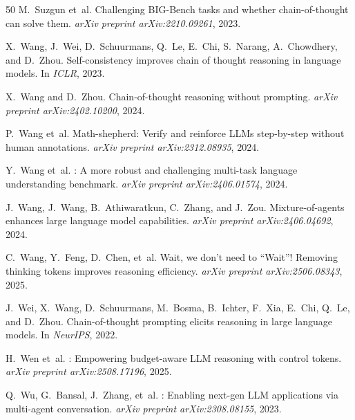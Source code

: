 \documentclass[11pt]{article}
\begin{document}
\begin{thebibliography}{50}
M.~Suzgun et~al.
\newblock Challenging {BIG-Bench} tasks and whether chain-of-thought can solve them.
\newblock \emph{arXiv preprint arXiv:2210.09261}, 2023.

X.~Wang, J.~Wei, D.~Schuurmans, Q.~Le, E.~Chi, S.~Narang, A.~Chowdhery, and D.~Zhou.
\newblock Self-consistency improves chain of thought reasoning in language models.
\newblock In \emph{ICLR}, 2023.

X.~Wang and D.~Zhou.
\newblock Chain-of-thought reasoning without prompting.
\newblock \emph{arXiv preprint arXiv:2402.10200}, 2024.

P.~Wang et~al.
\newblock Math-shepherd: Verify and reinforce {LLMs} step-by-step without human annotations.
\newblock \emph{arXiv preprint arXiv:2312.08935}, 2024.

Y.~Wang et~al.
: A more robust and challenging multi-task language understanding benchmark.
\newblock \emph{arXiv preprint arXiv:2406.01574}, 2024.

J.~Wang, J.~Wang, B.~Athiwaratkun, C.~Zhang, and J.~Zou.
\newblock Mixture-of-agents enhances large language model capabilities.
\newblock \emph{arXiv preprint arXiv:2406.04692}, 2024.

C.~Wang, Y.~Feng, D.~Chen, et~al.
\newblock Wait, we don't need to ``{Wait}''! Removing thinking tokens improves reasoning efficiency.
\newblock \emph{arXiv preprint arXiv:2506.08343}, 2025.

J.~Wei, X.~Wang, D.~Schuurmans, M.~Bosma, B.~Ichter, F.~Xia, E.~Chi, Q.~Le, and D.~Zhou.
\newblock Chain-of-thought prompting elicits reasoning in large language models.
\newblock In \emph{NeurIPS}, 2022.

H.~Wen et~al.
: Empowering budget-aware {LLM} reasoning with control tokens.
\newblock \emph{arXiv preprint arXiv:2508.17196}, 2025.

Q.~Wu, G.~Bansal, J.~Zhang, et~al.
: Enabling next-gen {LLM} applications via multi-agent conversation.
\newblock \emph{arXiv preprint arXiv:2308.08155}, 2023.


\end{thebibliography}
\end{document}
